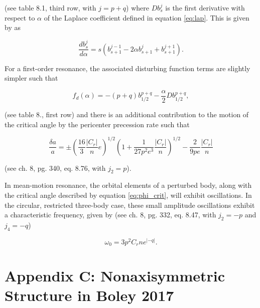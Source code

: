 \noindent (see \cite{murray99} table 8.1, third row, with $j = p + q$) where $D b^{j}_{s}$ is the first derivative with respect to $
\alpha$ of the Laplace coefficient defined in equation \ref{eq:lap}. This is given by \cite{brouwer61} as

\begin{equation}\label{eq:lap_d}
	\frac{d b_{s}^{j}}{d \alpha} = s \left( b_{s+1}^{j-1} - 2 \alpha b_{s+1}^{j} + b_{s+1}^{j+1} \right).
\end{equation}

For a first-order resonance, the associated disturbing function terms are slightly simpler such that

\begin{equation}\label{eq:fd_fo}
	f_{d}(\alpha) = -(p+q) b_{1/2}^{p+q} - \frac{\alpha}{2} D b_{1/2}^{p+q},
\end{equation}

\noindent (see \cite{murray99} table 8., first row) and there is an additional contribution to the motion of the critical angle by the 
pericenter precession rate such that

\begin{equation}\label{eq:res_fo}
	\frac{\delta a}{a} = \pm \left(\frac{16}{3} \frac{\left| C_{r} \right|}{n} e \right)^{1/2} \left(  1 + \frac{1}{27 p^2 e^3} \frac{\left| C_{r} \right|}{n} 
	\right)^{1/2} - \frac{2}{9 p e}  \frac{\left| C_{r} \right|}{n}
\end{equation}

\noindent (see \cite{murray99} ch. 8, pg. 340, eq. 8.76, with $j_{2} = p$).

In mean-motion resonance, the orbital elements of a perturbed body, along with the critical angle described by equation
\ref{eq:phi_crit}, will exhibit oscillations. In the circular, restricted three-body case, these small amplitude oscillations exhibit a 
characteristic frequency, given by (see \cite{murray99} ch. 8, pg. 332, eq. 8.47, with $j_{2} =-p$ and $j_{4} = -q$)

\begin{equation}\label{eq:lib_time}
	\omega_{0} = 3 p^{2} C_{r} n e^{\left| -q \right|}.
\end{equation}

\section{Appendix C: Nonaxisymmetric Structure in Boley 2017}\label{sec:boley_plot}

